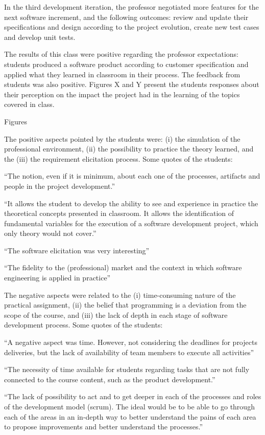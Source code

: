 In the third development iteration, the professor negotiated more features for the next software increment, and the following outcomes: review and update their specifications and design according to the project evolution, create new test cases and develop unit tests.

The results of this class were positive regarding the professor expectations: students produced a software product according to customer specification and applied what they learned in classroom in their process. The feedback from students was also positive. Figures X and Y present the students responses about their perception on the impact the project had in the learning of the topics covered in class.

Figures

The positive aspects pointed by the students were: (i) the simulation of the professional environment, (ii) the possibility to practice the theory learned, and the (iii) the requirement elicitation process. Some quotes of the students:

“The notion, even if it is minimum, about each one of the processes, artifacts and people in the project development.”

“It allows the student to develop the ability to see and experience in practice the theoretical concepts presented in classroom. It allows the identification of fundamental variables for the execution of a software development project, which only theory would not cover.”

“The software elicitation was very interesting”

“The fidelity to the (professional) market and the context in which software engineering is applied in practice”

The negative aspects were related to the (i) time-consuming nature of the practical assignment, (ii) the belief that programming is a deviation from the scope of the course, and (iii) the lack of depth in each stage of software development process. Some quotes of the students:

“A negative aspect was time. However, not considering the deadlines for projects deliveries, but the lack of availability of team members to execute all activities”

“The necessity of time available for students regarding tasks that are not fully connected to the course 
content, such as the product development.”

“The lack of possibility to act and to get deeper in each of the processes and roles of the development model (scrum). The ideal would be to be able to go through each of the areas in an in-depth way to better understand the pains of each area to propose improvements and better understand the processes.”

